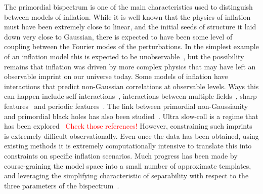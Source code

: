 The primordial bispectrum is one of the main
characteristics used to distinguish between models of inflation. While it is well
known that the physics of inflation must have been extremely close
to linear, and the initial seeds of structure it laid down
very close to Gaussian, there is expected to have been some level of coupling
between the Fourier modes of the perturbations.
In the simplest example of an inflation model this is
expected to be unobservable~\cite{Maldacena},
but the possibility remains that inflation was driven by
more complex physics that may have left an observable imprint on our universe today.
Some models of inflation have interactions that predict non-Gaussian
correlations at observable levels. Ways this can happen include
self-interactions~\cite{px_burrage,dbi_in_the_sky},
interactions between multiple fields~\cite{Byrnes_2010, Gao_turn,
achucarro_multifield1, achucarro_multifield2, achucarro_robust_16, achucarro_natural,
achucarro_quad_viability, achucarro_gsr_cs_14, achucarro_cs_reduction_13,
achucarro_gong_cs_corr, achucarro_cs_12, achucarro_eft, curvaton_comprehensive},
sharp features~\cite{adshead, gsr, step_novaes}
and periodic features~\cite{flauger_pajer_resonant, Pajer_2013, Meerburg_2012, Meerburg_osc, Meerburg_2010,
Barnaby_2011, Peiris_2013, Easther_2013, Cabass_2018, Behbahani_2011}.
The link between primordial non-Gaussianity and primordial black
holes has also been studied~\cite{pbh_byrnes, pbh_young, pbh_franciolini, pbh_passaglia}.
Ultra slow-roll is a regime that has been explored~\cite{usr_chowdhury,usr_pattison,
usr_dimopoulos,usr_martin}
\textcolor{red}{Check those references!}
However, constraining such imprints is extremely difficult observationally.
Even once the data has been obtained, using existing methods it is
extremely computationally intensive to translate this into constraints
on specific inflation scenarios. Much progress has been made by course-graining
the model space into a small number of approximate templates,
and leveraging the simplifying characteristic of separability
with respect to the three parameters of the bispectrum~\cite{Komatsu_2005, Munchmeyer_2014}.


